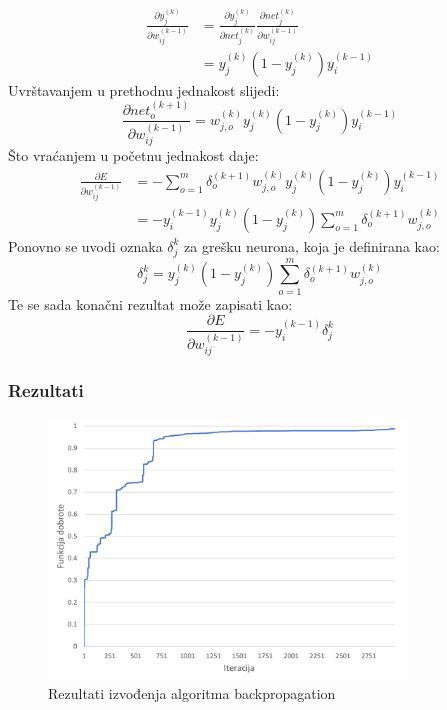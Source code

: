\documentclass[times, utf8, zavrsni, numeric]{fer}
\begin{document}
\begin{equation*}
\begin{split}
    \frac{\partial y_j^{(k)}}{\partial w_{ij}^{(k-1)}}
        & = \frac{\partial y_j^{(k)}}{\partial net_{j}^{(k)}}
            \frac{\partial net_{j}^{(k)}}{\partial w_{ij}^{(k-1)}}\\
        & = y_j^{(k)} (1 - y_j^{(k)}) y_i^{(k - 1)}
\end{split}
\end{equation*}
Uvrštavanjem u prethodnu jednakost slijedi:
\[
    \frac{\partial net_o^{(k + 1)}}{\partial w_{ij}^{(k-1)}}
        = w_{j,o}^{(k)}y_j^{(k)} (1 - y_j^{(k)}) y_i^{(k - 1)}
\]
Što vraćanjem u početnu jednakost daje:
\begin{equation*}
\begin{split}
    \frac{\partial E}{\partial w_{ij}^{(k-1)}}
        & = -\displaystyle\sum_{o = 1}^m\delta_o^{(k+1)}w_{j,o}^{(k)}y_j^{(k)} (1 - y_j^{(k)}) y_i^{(k - 1)}\\
        & = -y_i^{(k - 1)} y_j^{(k)} (1 - y_j^{(k)})\displaystyle\sum_{o = 1}^m\delta_o^{(k+1)}w_{j,o}^{(k)}
\end{split}
\end{equation*}
Ponovno se uvodi oznaka $\delta_j^{k}$ za grešku neurona, koja je definirana kao:
\[
    \delta_j^{k} = y_j^{(k)} (1 - y_j^{(k)})\displaystyle\sum_{o = 1}^m\delta_o^{(k+1)}w_{j,o}^{(k)} 
\]
Te se sada konačni rezultat može zapisati kao:
\[
    \frac{\partial E}{\partial w_{ij}^{(k-1)}} =
    -y_i^{(k - 1)}\delta_j^{k}
\]

\subsubsection{Rezultati}
\begin{figure}[ht!]
    \centering
    \includegraphics[width=0.85\textwidth]{Images/Backprop.pdf}
    \captionsetup{justification=centering}
    \caption{Rezultati izvođenja algoritma backpropagation}
    \label{fig:backprop}
\end{figure}
\end{document}

